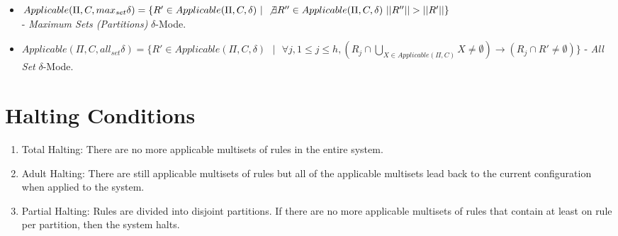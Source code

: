 \documentclass[a4paper]{article}
\theoremstyle{definition}
\newcommand{\ts}{\text{ }}
\begin{document}
\begin{itemize}
   \item $Applicable(\Pi, C, max_{set}\delta) = \{R' \in Applicable(\Pi, C, \delta) \ts | \ts \not\exists R'' \in  
         Applicable(\Pi,C, \delta) \ts ||R''|| > ||R'||\}$\\ - \textit{Maximum Sets (Partitions)} $            
         \delta$-Mode.                                                                                  
   \item $Applicable(\Pi, C, all_{set}\delta) = \{R' \in Applicable(\Pi, C, \delta) \ts | \ts \forall j, 1 \leq j  
         \leq h, (R_j \cap \bigcup_{X \in Applicable(\Pi,C)} X \neq \emptyset) \rightarrow (R_j \cap R'    
         \neq \emptyset)\}$ - \textit{All Set} $\delta$-Mode.                                           
\end{itemize}


\section{Halting Conditions}\label{app-halt}

\begin{enumerate}
\item Total Halting: There are no more applicable multisets of rules in the entire system. 
\item Adult Halting: There are still applicable multisets of rules but all of the applicable 
      multisets lead back to the current configuration when applied to the system.
\item Partial Halting: Rules are divided into disjoint partitions. If there are no more applicable
      multisets of rules that contain at least on rule per partition, then the system halts.
\end{enumerate}



\end{document}

